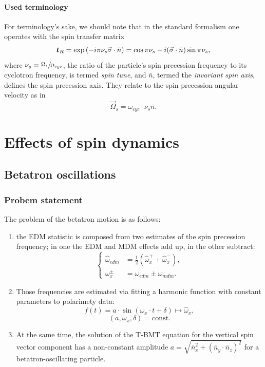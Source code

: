 \documentclass[]{elsarticle}
\newcommand{\w}{\omega}
\newcommand{\W}{\Omega}
\newcommand{\nbar}{\bar n}
\newcommand{\const}{\mathrm{const}}
\begin{document}
\paragraph{Used terminology}
For terminology's sake, we should note that in the standard formalism one operates with
the spin transfer matrix~\cite[p.~4]{COSY:SpinTuneMapping}
\[
\boldsymbol{t}_R = \exp\bkt{-i\pi\nu_s\vec\sigma\cdot\bar n} = \cos\pi\nu_s - i (\vec\sigma\cdot\bar n)\sin\pi\nu_s,
\]
where $\nu_s = \sfrac{\W_s}{\W_{cyc}}$, the ratio of the particle's spin precession frequency to
its cyclotron frequency, is termed \emph{spin tune}, and $\bar n$, termed the \emph{invariant spin axis},
defines the spin precession axis. They relate to the spin precession angular velocity as in
\[
\vec\W_s = \w_{cyc}\cdot \nu_s\bar n.
\]

\section{Effects of spin dynamics}
\subsection{Betatron oscillations}

\subsubsection{Probem statement}
The problem of the betatron motion is as follows:
\begin{enumerate}
\item the EDM statistic is composed from two estimates of the spin precession frequency;
  in one the EDM and MDM effects add up, in the other subtract:
  \begin{equation*}
    \begin{cases}
      \hat\w_{edm} &= \frac12(\hat\w_x^+ + \hat\w_x^-),\\
      \w_x^\pm &= \w_{edm} \pm \w_{mdm}.
    \end{cases}
  \end{equation*}
\item Those frequencies are estimated via fitting a harmonic function with constant parameters to
  polarimety data:
\[
f(t) = a\cdot\sin(\w_x\cdot t + \delta) \mapsto \hat\w_x,
\]
\[
(a,\w_x,\delta) = \const.
\]

\item At the same time, the solution of the T-BMT equation for the vertical spin vector component
  has a non-constant amplitude $a = \sqrt{\nbar_x^2 + (\nbar_y\cdot\nbar_z)^2}$
  for a betatron-oscillating particle.
\end{enumerate}
\end{document}
